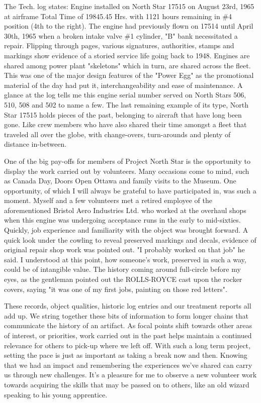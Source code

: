 The Tech. log states: Engine installed on North Star 17515 on August 23rd, 1965
at airframe Total Time of 19845.45 Hrs. with 1121 hours remaining in \#4
position (4th to the right). The engine had previously flown on 17514 until
April 30th, 1965 when a broken intake valve \@ \#1 cylinder, "B" bank
necessitated a repair. Flipping through pages, various signatures, authorities,
stamps and markings show evidence of a storied service life going back to 1948.
Engines are shared among power plant "skeletons" which in turn, are shared
across the fleet. This was one of the major design features of the "Power Egg"
as the promotional material of the day had put it, interchangeability and ease
of maintenance. A glance at the log tells me this engine serial number served
on North Stars 506, 510, 508 and 502 to name a few. The last remaining example
of its type, North Star 17515 holds pieces of the past, belonging to aircraft
that have long been gone. Like crew members who have also shared their time
amongst a fleet that traveled all over the globe, with change-overs,
turn-arounds and plenty of distance in-between.  

One of the big pay-offs for members of Project North Star is the opportunity to
display the work carried out by volunteers. Many occasions come to mind, such
as Canada Day, Doors Open Ottawa and family visits to the Museum. One
opportunity, of which I will always be grateful to have participated in, was
such a moment. Myself and a few volunteers met a retired employee of the
aforementioned Bristol Aero Industries Ltd. who worked at the overhaul shops
when this engine was undergoing acceptance runs in the early to mid-sixties.
Quickly, job experience and familiarity with the object was brought forward. A
quick look under the cowling to reveal preserved markings and decals, evidence
of original repair shop work was pointed out. "I probably worked on that job"
he said. I understood at this point, how someone's work, preserved in such a
way, could be of intangible value. The history coming around full-circle before
my eyes, as the gentleman pointed out the ROLLS-ROYCE cast upon the rocker
covers, saying "it was one of my first jobs, painting on those red letters". 

These records, object qualities, historic log entries and our treatment reports
all add up. We string together these bits of information to form longer chains
that communicate the history of an artifact. As focal points shift towards
other areas of interest, or priorities, work carried out in the past helps
maintain a continued relevance for others to pick-up where we left off. With
such a long term project, setting the pace is just as important as taking a
break now and then. Knowing that we had an impact and remembering the
experiences we've shared can carry us through new challenges. It's a pleasure
for me to observe a new volunteer work towards acquiring the skills that may be
passed on to others, like an old wizard speaking to his young apprentice. 

